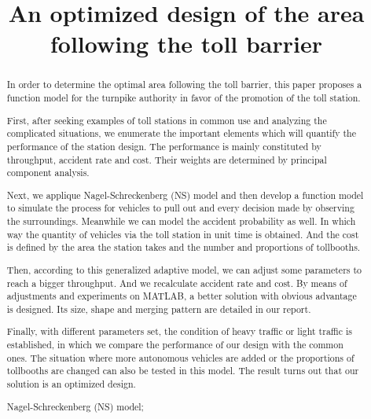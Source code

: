 \documentclass{mcmthesis}
\title{An optimized design of the area following the toll barrier }
\begin{document}
	
	
\begin{abstract}
	
In order to determine the optimal area following the toll barrier, this paper proposes a function model for the turnpike authority in favor of the promotion of the toll station.

First, after seeking examples of toll stations in common use and analyzing the complicated situations, we enumerate the important elements which will quantify the performance of the station design. The performance is mainly constituted by throughput, accident rate and cost. Their weights are determined by principal component analysis. 

Next, we applique Nagel-Schreckenberg (NS) model and then develop a function model to simulate the process for vehicles to pull out and every decision made by observing the surroundings. Meanwhile we can model the accident probability as well. In which way the quantity of vehicles via the toll station in unit time is obtained. And the cost is defined by the area the station takes and the number and proportions of tollbooths. 

Then, according to this generalized adaptive model, we can adjust some parameters to reach a bigger throughput. And we recalculate accident rate and cost. By means of adjustments and experiments on MATLAB, a better solution with obvious advantage is designed. Its size, shape and merging pattern are detailed in our report.

Finally, with different parameters set, the condition of heavy traffic or light traffic is established, in which we compare the performance of our design with the common ones. The situation where more autonomous vehicles are added or the proportions of tollbooths are changed can also be tested in this model. The result turns out that our solution is an optimized design.

   
  
  
  
\begin{keywords}
 Nagel-Schreckenberg (NS) model;
\end{keywords}
\end{abstract}

\maketitle
\tableofcontents
\clearpage
\end{document}
